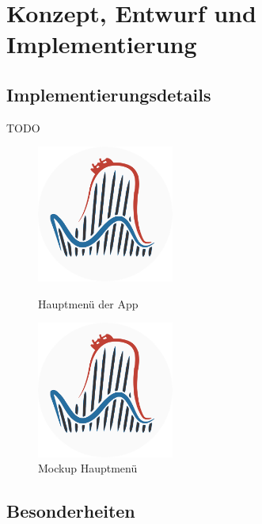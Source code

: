 \chapter{Konzept, Entwurf und Implementierung}
\label{cha:implementierung}

\section{Implementierungsdetails}
\label{sec:implementierung:implementierungsdetails}

TODO

\begin{figure}[h]
    \centering
    \begin{minipage}{0.49\textwidth}
        \centering
        \includegraphics[width=0.4\textwidth]{img/coaster42_logo.png}
        \caption{Hauptmenü der App}
		\label{figure:implementierungmenue}
    \end{minipage}
    \begin{minipage}{0.49\textwidth}
        \centering
        \includegraphics[width=0.4\textwidth]{img/coaster42_logo.png}
        \caption{Mockup Hauptmenü}
    \end{minipage}
\end{figure}



\section{Besonderheiten}
\label{sec:implementierung:besonderheiten }


